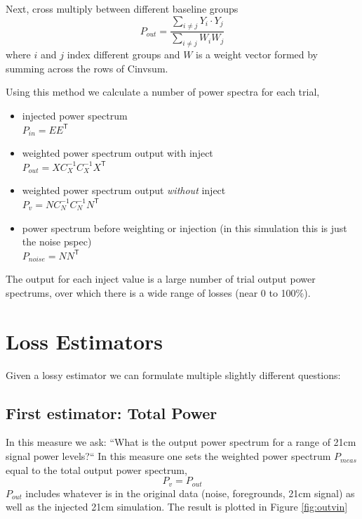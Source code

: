 \documentclass{article}
\begin{document}
Next, cross multiply between different baseline groups
\begin{equation}
P_{out} = \frac{\sum_{i\neq j} Y_i \cdot Y_j }{\sum_{i\neq j} W_i W_j}
\end{equation}
where $i$ and $j$ index different groups and $W$ is a weight vector formed by summing across the rows of Cinvsum.


Using this method we calculate a number of power spectra for each trial,
\begin{itemize}
\item injected power spectrum \\
$P_{in} = E E^\mathsf{T}$
\item weighted power spectrum output with inject \\
$P_{out} = X C_X^{-1} C_X^{-1} X^\mathsf{T}$ 
\item weighted power spectrum output \emph{without} inject \\
$P_{v} = N C_N^{-1} C_N^{-1} N^\mathsf{T}$
\item power spectrum before weighting or injection (in this simulation this is just the noise pspec) \\
$P_{noise} = N N^\mathsf{T}$
\end{itemize}

The output for each inject value is a large number of trial output power spectrums, over which there is a wide range of losses (near 0 to 100\%).  

\section*{Loss Estimators}

Given a lossy estimator we can formulate multiple slightly different questions:
\subsection*{First estimator: Total Power} 
In this measure we ask: ``What is the output power spectrum for a range of 21cm signal power levels?`` In this measure one sets the weighted power spectrum $P_{meas}$ equal to the total output power spectrum,
\begin{equation}
P_{v} = P_{out} 
\end{equation}
$P_{out}$ includes whatever is in the original data (noise, foregrounds, 21cm signal) as well as the injected 21cm simulation.  The result is plotted in Figure \ref{fig:outvin}
\end{document}
